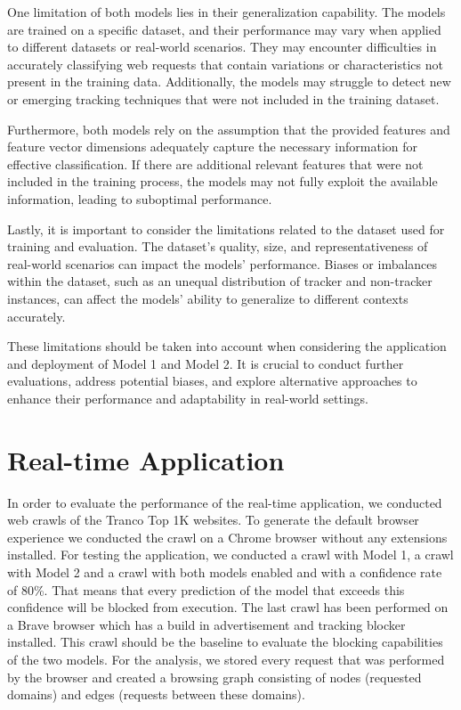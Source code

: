 One limitation of both models lies in their generalization capability. The models are trained on a specific dataset,
and their performance may vary when applied to different datasets or real-world scenarios. They may encounter difficulties
in accurately classifying web requests that contain variations or characteristics not present in the training data. Additionally,
the models may struggle to detect new or emerging tracking techniques that were not included in the training dataset.

Furthermore, both models rely on the assumption that the provided features and feature vector dimensions adequately capture the
necessary information for effective classification. If there are additional relevant features that were not included in the training
process, the models may not fully exploit the available information, leading to suboptimal performance.

Lastly, it is important to consider the limitations related to the dataset used for training and evaluation. The dataset's quality,
size, and representativeness of real-world scenarios can impact the models' performance. Biases or imbalances within the dataset,
such as an unequal distribution of tracker and non-tracker instances, can affect the models' ability to generalize to different
contexts accurately.

These limitations should be taken into account when considering the application and deployment of Model 1 and Model 2. It is
crucial to conduct further evaluations, address potential biases, and explore alternative approaches to enhance their performance
and adaptability in real-world settings.

\section{Real-time Application}

In order to evaluate the performance of the real-time application, we conducted web crawls of the Tranco Top 1K websites. 
To generate the default browser experience we conducted the crawl on a Chrome browser without any extensions installed. For testing
the application, we conducted a crawl with Model 1, a crawl with Model 2 and a crawl with both models enabled and with a confidence
rate of 80\%. That means that every prediction of the model that exceeds this confidence will be blocked from execution. The last crawl
has been performed on a Brave browser which has a build in advertisement and tracking blocker installed. This crawl should be the baseline to evaluate
the blocking capabilities of the two models. For the analysis, we stored every request that was performed by the browser and created a 
browsing graph consisting of nodes (requested domains) and edges (requests between these domains).


